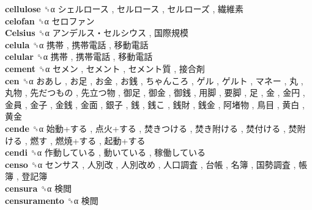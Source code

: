 \textbf{cellulose} ␝α   シェルロース ,  セルロース ,  セルローズ ,  繊維素   \\
\textbf{celofan} ␝α   セロファン   \\
\textbf{Celsius} ␝α   アンデルス・セルシウス ,  国際規模   \\
\textbf{celula} ␝α   携帯 ,  携帯電話 ,  移動電話   \\
\textbf{celular} ␝α   携帯 ,  携帯電話 ,  移動電話   \\
\textbf{cement} ␝α   セメン ,  セメント ,  セメント質 ,  接合剤   \\
\textbf{cen} ␝α   おあし ,  お足 ,  お金 ,  お銭 ,  ちゃんころ ,  ゲル ,  ゲルト ,  マネー ,  丸 ,  丸物 ,  先だつもの ,  先立つ物 ,  御足 ,  御金 ,  御銭 ,  用脚 ,  要脚 ,  足 ,  金 ,  金円 ,  金員 ,  金子 ,  金銭 ,  金面 ,  銀子 ,  銭 ,  銭こ ,  銭財 ,  銭金 ,  阿堵物 ,  鳥目 ,  黄白 ,  黄金   \\
\textbf{cende} ␝α   始動+する ,  点火+する ,  焚きつける ,  焚き附ける ,  焚付ける ,  焚附ける ,  燃す ,  燃焼+する ,  起動+する   \\
\textbf{cendi} ␝α   作動している ,  動いている ,  稼働している   \\
\textbf{censo} ␝α   センサス ,  人別改 ,  人別改め ,  人口調査 ,  台帳 ,  名簿 ,  国勢調査 ,  帳簿 ,  登記簿   \\
\textbf{censura} ␝α   検閲   \\
\textbf{censuramento} ␝α   検閲   \\

